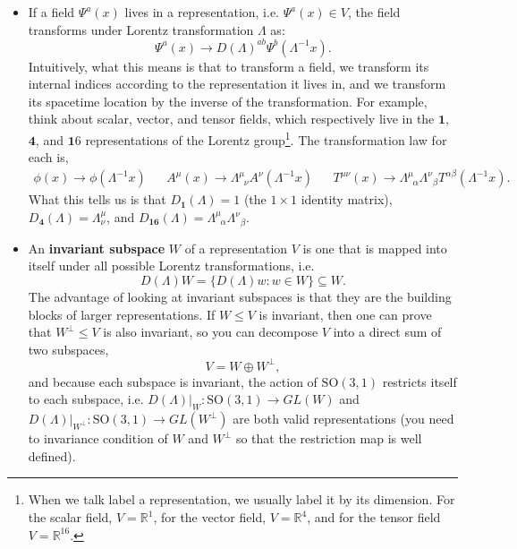 \documentclass[12pt, oneside]{article}   	%
\theoremstyle{definition}
\begin{document}
\begin{itemize}
	\item If a field $\Psi^a(x)$ lives in a representation, i.e. $\Psi^a(x)\in V$, the field transforms under Lorentz transformation $\Lambda$ as:
	\begin{equation}
		\Psi^a(x) \longrightarrow D(\Lambda)^{ab} \Psi^b(\Lambda^{-1} x).
	\end{equation}
	Intuitively, what this means is that to transform a field, we transform its internal indices according to the representation it lives in, and we transform its spacetime location by the inverse of the transformation. For example, think about scalar, vector, and tensor fields, which respectively live in the $\bm 1$, $\bm 4$, and $\bm 16$ representations of the Lorentz group\footnote{When we talk label a representation, we usually label it by its dimension. For the scalar field, $V = \mathbb R^1$, for the vector field, $V = \mathbb R^4$, and for the tensor field $V = \mathbb R^{16}$.}. The transformation law for each is,
	\begin{align}
		\phi(x)\rightarrow \phi(\Lambda^{-1} x) && A^\mu(x)\rightarrow \Lambda^\mu_{\;\;\nu} A^\nu(\Lambda^{-1} x) && T^{\mu\nu}(x)\rightarrow \Lambda^\mu_{\;\;\alpha} \Lambda^\nu_{\;\;\beta} T^{\alpha\beta}(\Lambda^{-1} x). 
	\end{align}
	What this tells us is that $D_{\bm 1}(\Lambda) = 1$ (the $1\times 1$ identity matrix), $D_{\bm 4}(\Lambda) = \Lambda^\mu_\nu$, and $D_{\bm{16}}(\Lambda) = \Lambda^\mu_{\;\;\alpha}\Lambda^{\nu}_{\;\;\beta}$. 
	
	\item An \textbf{invariant subspace} $W$ of a representation $V$ is one that is mapped into itself under all possible Lorentz transformations, i.e.
	\begin{equation}
		D(\Lambda) W = \{D(\Lambda) w : w\in W\} \subseteq W.
	\end{equation}
	The advantage of looking at invariant subspaces is that they are the building blocks of larger representations. If $W\leq V$ is invariant, then one can prove that $W^\perp\leq V$ is also invariant, so you can decompose $V$ into a direct sum of two subspaces,
	\begin{equation}
		V = W\oplus W^\perp,
	\end{equation}
	and because each subspace is invariant, the action of $\mathrm{SO}(3, 1)$ restricts itself to each subspace, i.e. $D(\Lambda)|_W : \mathrm{SO}(3, 1) \rightarrow GL(W)$ and $D(\Lambda)|_{W^\perp} : \mathrm{SO}(3, 1) \rightarrow GL(W^\perp)$ are both valid representations (you need to invariance condition of $W$ and $W^\perp$ so that the restriction map is well defined). 
	

\end{itemize}
\end{document}
